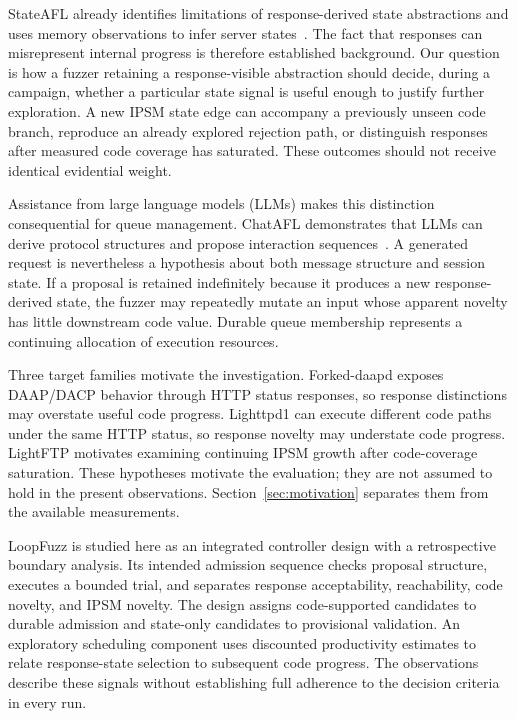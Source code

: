 \documentclass[final,5p,times,number]{elsarticle}
\begin{document}
StateAFL already identifies limitations of response-derived state abstractions and uses memory observations to infer server states~\cite{stateafl}. The fact that responses can misrepresent internal progress is therefore established background. Our question is how a fuzzer retaining a response-visible abstraction should decide, during a campaign, whether a particular state signal is useful enough to justify further exploration. A new IPSM state edge can accompany a previously unseen code branch, reproduce an already explored rejection path, or distinguish responses after measured code coverage has saturated. These outcomes should not receive identical evidential weight.

Assistance from large language models (LLMs) makes this distinction consequential for queue management. ChatAFL demonstrates that LLMs can derive protocol structures and propose interaction sequences~\cite{chatafl}. A generated request is nevertheless a hypothesis about both message structure and session state. If a proposal is retained indefinitely because it produces a new response-derived state, the fuzzer may repeatedly mutate an input whose apparent novelty has little downstream code value. Durable queue membership represents a continuing allocation of execution resources.

Three target families motivate the investigation. Forked-daapd exposes DAAP/DACP behavior through HTTP status responses, so response distinctions may overstate useful code progress. Lighttpd1 can execute different code paths under the same HTTP status, so response novelty may understate code progress. LightFTP motivates examining continuing IPSM growth after code-coverage saturation. These hypotheses motivate the evaluation; they are not assumed to hold in the present observations. Section~\ref{sec:motivation} separates them from the available measurements.

LoopFuzz is studied here as an integrated controller design with a retrospective boundary analysis. Its intended admission sequence checks proposal structure, executes a bounded trial, and separates response acceptability, reachability, code novelty, and IPSM novelty. The design assigns code-supported candidates to durable admission and state-only candidates to provisional validation. An exploratory scheduling component uses discounted productivity estimates to relate response-state selection to subsequent code progress. The observations describe these signals without establishing full adherence to the decision criteria in every run.
\end{document}
